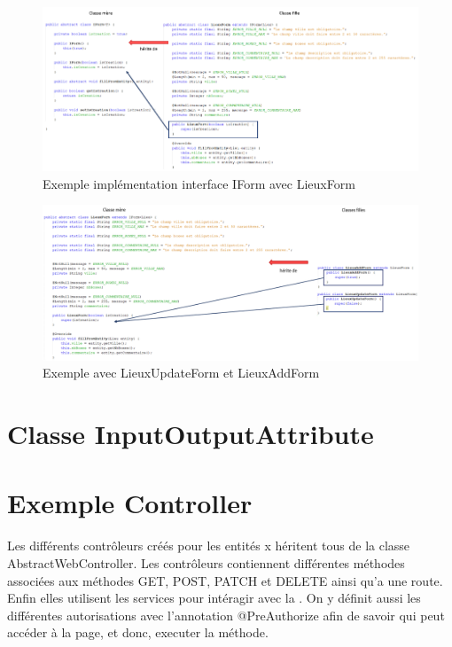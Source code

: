 		\begin{figure}[H]
			\centering\includegraphics[width=1\textwidth, keepaspectratio]{res/IForm.png}
			\caption{Exemple implémentation interface IForm avec LieuxForm}
		\end{figure}

		\begin{figure}[H]
			\centering\includegraphics[width=1\textwidth, keepaspectratio]{res/formClassFilles.png}
			\caption{Exemple avec LieuxUpdateForm et LieuxAddForm}
		\end{figure}

	\section{Classe InputOutputAttribute}


	\section{Exemple Controller}


		Les différents contrôleurs créés pour les entités x héritent tous de la classe AbstractWebController. \newline
		Les contrôleurs contiennent différentes méthodes associées aux méthodes GET, POST, PATCH et DELETE ainsi qu'a une route. Enfin elles utilisent les services pour intéragir avec la \bdd{}. On y définit aussi les différentes autorisations avec l'annotation @PreAuthorize afin de savoir qui peut accéder à la page, et donc, executer la méthode.

